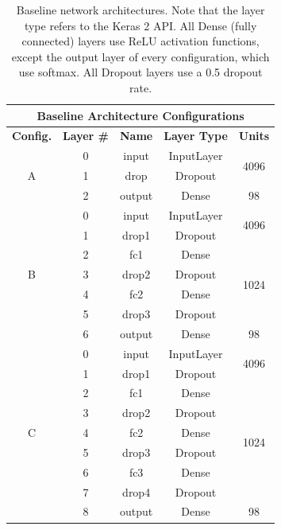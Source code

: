 \begin{table}[h!]
\begin{center}
\begin{tabular}{|c|c|c|c|c|}
\hline
\multicolumn{5}{|c|}{Baseline Architecture Configurations} \\ \hline
\textbf{Config.} & \textbf{Layer \#} & \textbf{Name} & \textbf{Layer Type} & \textbf{Units} \\ \hline
\multirow{3}{*}{A} & 0 & input & InputLayer & \multirow{2}{*}{4096} \\ \cline{2-4}
 & 1 & drop & Dropout & \\ \cline{2-5}
 & 2 & output & Dense & 98 \\ \hline
\multirow{7}{*}{B} & 0 & input & InputLayer & \multirow{2}{*}{4096} \\ \cline{2-4}
 & 1 & drop1 & Dropout & \\ \cline{2-5}
 & 2 & fc1 & Dense & \multirow{4}{*}{1024} \\ \cline{2-4}
 & 3 & drop2 & Dropout & \\ \cline{2-4}
 & 4 & fc2 & Dense & \\ \cline{2-4}
 & 5 & drop3 & Dropout & \\ \cline{2-5}
 & 6 & output & Dense & 98 \\ \hline
\multirow{9}{*}{C} & 0 & input & InputLayer & \multirow{2}{*}{4096} \\ \cline{2-4}
 & 1 & drop1 & Dropout & \\ \cline{2-5}
 & 2 & fc1 & Dense & \multirow{6}{*}{1024} \\ \cline{2-4}
 & 3 & drop2 & Dropout & \\ \cline{2-4}
 & 4 & fc2 & Dense & \\ \cline{2-4}
 & 5 & drop3 & Dropout & \\ \cline{2-4}
 & 6 & fc3 & Dense & \\ \cline{2-4}
 & 7 & drop4 & Dropout & \\ \cline{2-5}
 & 8 & output & Dense & 98 \\ \hline
\end{tabular}
\end{center}
\caption[Baseline architectures]{Baseline network architectures. Note that the layer type refers to the Keras 2 API. All Dense (fully connected) layers use ReLU activation functions, except the output layer of every configuration, which use softmax. All Dropout layers use a 0.5 dropout rate.}
\label{tab:base-arch}
\end{table}

